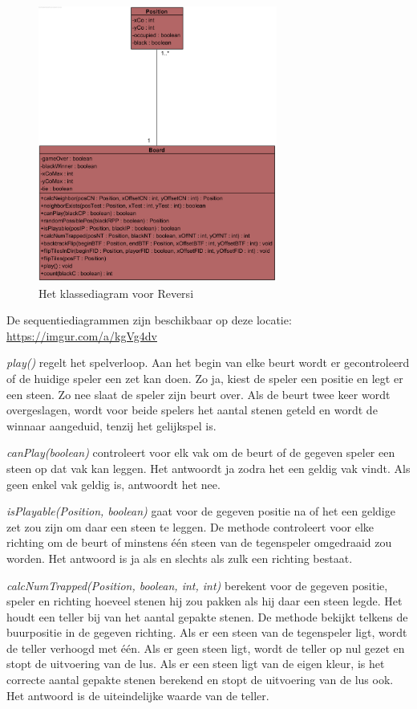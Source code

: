 \begin{figure}
	\centering
	\includegraphics[width=0.7\textwidth]{chap-evaluatie/reversi-cd.png}
	\caption{Het klassediagram voor Reversi}
	\label{fig:reversi-cd}
\end{figure}

De sequentiediagrammen zijn beschikbaar op deze locatie: \url{https://imgur.com/a/kgVg4dv} 

\textit{play()} regelt het spelverloop. Aan het begin van elke beurt wordt er gecontroleerd of de huidige speler een zet kan doen. Zo ja, kiest de speler een positie en legt er een steen. Zo nee slaat de speler zijn beurt over. Als de beurt twee keer wordt overgeslagen, wordt voor beide spelers het aantal stenen geteld en wordt de winnaar aangeduid, tenzij het gelijkspel is.

\textit{canPlay(boolean)} controleert voor elk vak om de beurt of de gegeven speler een steen op dat vak kan leggen. Het antwoordt ja zodra het een geldig vak vindt. Als geen enkel vak geldig is, antwoordt het nee.

\textit{isPlayable(Position, boolean)} gaat voor de gegeven positie na of het een geldige zet zou zijn om daar een steen te leggen. De methode controleert voor elke richting om de beurt of minstens \'e\'en steen van de tegenspeler omgedraaid zou worden. Het antwoord is ja als en slechts als zulk een richting bestaat. 

\textit{calcNumTrapped(Position, boolean, int, int)} berekent voor de gegeven positie, speler en richting hoeveel stenen hij zou pakken als hij daar een steen legde. Het houdt een teller bij van het aantal gepakte stenen. De methode bekijkt telkens de buurpositie in de gegeven richting. Als er een steen van de tegenspeler ligt, wordt de teller verhoogd met \'e\'en. Als er geen steen ligt, wordt de teller op nul gezet en stopt de uitvoering van de lus. Als er een steen ligt van de eigen kleur, is het correcte aantal gepakte stenen berekend en stopt de uitvoering van de lus ook. Het antwoord is de uiteindelijke waarde van de teller.

